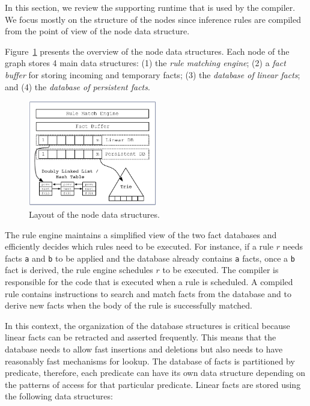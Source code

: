 In this section, we review the supporting runtime that is used by the compiler.
We focus mostly on the structure of the nodes since inference rules are compiled
from the point of view of the node data structure.

Figure~\ref{fig:node} presents the overview of the node data structures.  Each
node of the graph stores 4 main data structures: (1) the \emph{rule matching
   engine}; (2) a \emph{fact buffer} for storing incoming and temporary facts;
(3) the \emph{database of linear facts}; and (4) the \emph{database of
   persistent facts}.

\begin{figure}
\begin{center}
   \includegraphics[width=0.5\textwidth]{figures/overview.pdf}
\end{center}
\caption{Layout of the node data structures.}
\label{fig:node}
\vspace{-0.5cm}
\end{figure}

The rule engine maintains a simplified view of the two fact databases and
efficiently decides which rules need to be executed. For instance, if a rule $r$
needs facts \texttt{a} and \texttt{b} to be applied and the database already
contains \texttt{a} facts, once a \texttt{b} fact is derived, the rule engine
schedules $r$ to be executed. The compiler is responsible for the code that is
executed when a rule is scheduled.  A compiled rule contains instructions to
search and match facts from the database and to derive new facts when the body
of the rule is successfully matched.

In this context, the organization of the database structures is critical because
linear facts can be retracted and asserted frequently. This means that the
database needs to allow fast insertions and deletions but also needs to have
reasonably fast mechanisms for lookup. The database of facts is partitioned by
predicate, therefore, each predicate can have its own data structure depending
on the patterns of access for that particular predicate. Linear facts are stored
using the following data structures:

